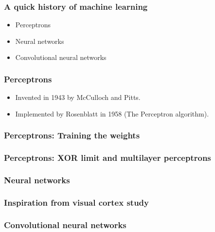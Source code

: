 \begin{frame}
  \frametitle{A quick history of machine learning}
  \begin{itemize}
  \item Perceptrons
  \item Neural networks
  \item Convolutional neural networks
  \end{itemize}
\end{frame}

\begin{frame}
  \frametitle{Perceptrons}
  {
    \small
    \begin{itemize}
    \item Invented in 1943 by McCulloch and Pitts.
    \item Implemented by Rosenblatt in 1958 (The Perceptron algorithm).
    \end{itemize}
  }
  \vspace{2.5in}
\end{frame}

\begin{frame}
  \frametitle{Perceptrons: Training the weights}
\end{frame}

\begin{frame}
  \frametitle{Perceptrons: XOR limit and multilayer perceptrons}
\end{frame}

\begin{frame}
  \frametitle{Neural networks}
\end{frame}

\begin{frame}
  \frametitle{Inspiration from visual cortex study}
\end{frame}

\begin{frame}
  \frametitle{Convolutional neural networks}
\end{frame}
